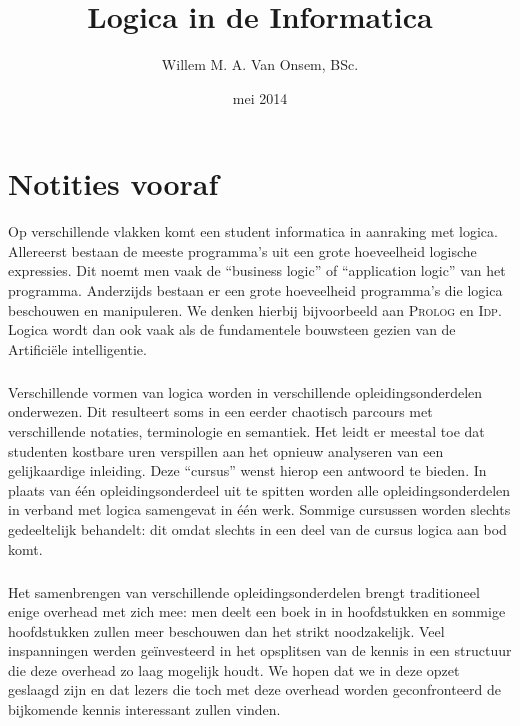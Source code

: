 \documentclass[titlepage,a4paper]{book}
\title{Logica in de Informatica}
\author{Willem M. A. Van Onsem, BSc.}
\date{mei 2014}
\newcommand{\prolog}{\textsc{Prolog}}
\newcommand{\idp}{\textsc{Idp}}
\begin{document}
\frontmatter
\begin{titlepage}
\maketitle
\end{titlepage}
\tableofcontents
\chapter*{Notities vooraf}
Op verschillende vlakken komt een student informatica in aanraking met logica. Allereerst bestaan de meeste programma's uit een grote hoeveelheid logische expressies. Dit noemt men vaak de ``business logic'' of ``application logic'' van het programma. Anderzijds bestaan er een grote hoeveelheid programma's die logica beschouwen en manipuleren. We denken hierbij bijvoorbeeld aan \prolog{} en \idp{}. Logica wordt dan ook vaak als de fundamentele bouwsteen gezien van de Artifici\"ele intelligentie.
\paragraph{}
Verschillende vormen van logica worden in verschillende opleidingsonderdelen onderwezen. Dit resulteert soms in een eerder chaotisch parcours met verschillende notaties, terminologie en semantiek. Het leidt er meestal toe dat studenten kostbare uren verspillen aan het opnieuw analyseren van een gelijkaardige inleiding. Deze ``cursus'' wenst hierop een antwoord te bieden. In plaats van \'e\'en opleidingsonderdeel uit te spitten worden alle opleidingsonderdelen in verband met logica samengevat in \'e\'en werk. Sommige cursussen worden slechts gedeeltelijk behandelt: dit omdat slechts in een deel van de cursus logica aan bod komt.
\paragraph{}
Het samenbrengen van verschillende opleidingsonderdelen brengt traditioneel enige overhead met zich mee: men deelt een boek in in hoofdstukken en sommige hoofdstukken zullen meer beschouwen dan het strikt noodzakelijk. Veel inspanningen werden ge\"investeerd in het opsplitsen van de kennis in een structuur die deze overhead zo laag mogelijk houdt. We hopen dat we in deze opzet geslaagd zijn en dat lezers die toch met deze overhead worden geconfronteerd de bijkomende kennis interessant zullen vinden.
\end{document}
